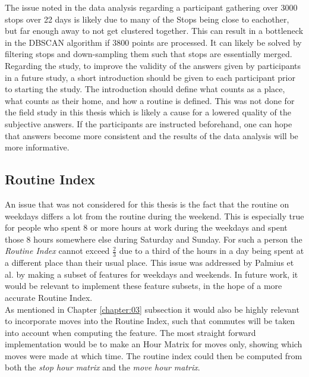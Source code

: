 The issue noted in the data analysis regarding a participant gathering over 3000 stops over 22 days is likely due to many of the Stops being close to eachother, but far enough away to not get clustered together. This can result in a bottleneck in the DBSCAN algorithm if 3800 points are processed. It can likely be solved by filtering stops and down-sampling them such that stops are essentially merged.\\

Regarding the study, to improve the validity of the answers given by participants in a future study, a short introduction should be given to each participant prior to starting the study. The introduction should define what counts as a place, what counts as their home, and how a routine is defined. This was not done for the field study in this thesis which is likely a cause for a lowered quality of the subjective answers. If the participants are instructed beforehand, one can hope that answers become more consistent and the results of the data analysis will be more informative.\\


\subsection{Routine Index}
An issue that was not considered for this thesis is the fact that the routine on weekdays differs a lot from the routine during the weekend. This is especially true for people who spent 8 or more hours at work during the weekdays and spent those 8 hours somewhere else during Saturday and Sunday. For such a person the \textit{Routine Index} cannot exceed $\frac{2}{3}$ due to a third of the hours in a day being spent at a different place than their usual place. This issue was addressed by Palmius et al. by making a subset of features for weekdays and weekends. In future work, it would be relevant to implement these feature subsets, in the hope of a more accurate Routine Index.\\

As mentioned in Chapter \ref{chapter:03} subsection \label{sub:routine-index} it would also be highly relevant to incorporate moves into the Routine Index, such that commutes will be taken into account when computing the feature. The most straight forward implementation would be to make an Hour Matrix for moves only, showing which moves were made at which time. The routine index could then be computed from both the \textit{stop hour matrix} and the \textit{move hour matrix}.

